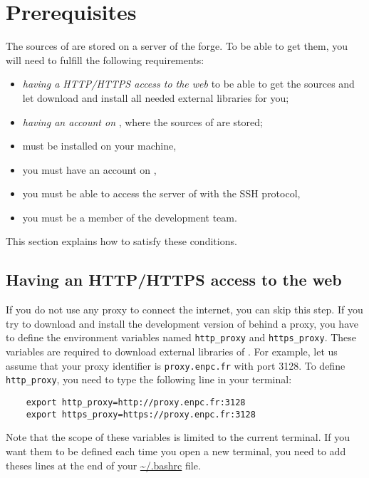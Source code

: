 \section{Prerequisites}

The sources of \Simol are stored on a server of the \SourceSup forge. To be able to get them, you will need to fulfill the following requirements:
\begin{itemize}
\item \textit{having a HTTP/HTTPS access to the web} to be able to get the sources and let \Simol download and install all needed external libraries for you; 
\item \textit{having an account on \SourceSup}, where the sources of \Simol are stored;
\item \Git must be installed on your machine,
\item you must have an account on \SourceSup,
\item you must be able to access the server of \SourceSup with the SSH protocol,
\item you must be a member of the \Simol development team.
\end{itemize}
This section explains how to satisfy these conditions.

\subsection{Having an HTTP/HTTPS access to the web}

If you do not use any proxy to connect the internet, you can skip this step. If you try to download and install the development version of \Simol behind a proxy, you have to define the environment variables named \texttt{http\_proxy} and \texttt{https\_proxy}. These variables are required to download external libraries of \Simol. For example, let us assume that your proxy identifier is \texttt{proxy.enpc.fr} with port 3128. To define \texttt{http\_proxy}, you need to type the following line in your terminal:

\begin{verbatim}
    export http_proxy=http://proxy.enpc.fr:3128
    export https_proxy=https://proxy.enpc.fr:3128
\end{verbatim}

Note that the scope of these variables is limited to the current terminal. If you want them to be defined each time you open a new terminal, you need to add theses lines at the end of your \url{~/.bashrc} file.

